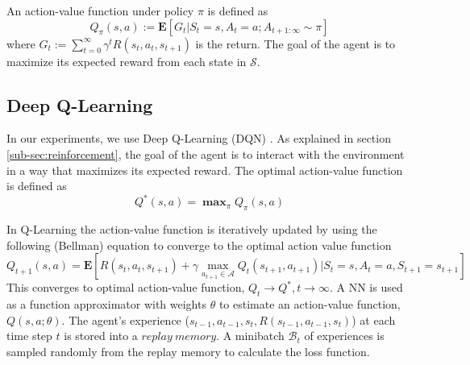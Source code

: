 \documentclass{article}
\newcommand{\cS}{\mathcal{S}}
\newcommand{\cA}{\mathcal{A}}
\newcommand{\cB}{\mathcal{B}}
\begin{document}
An action-value function under policy $\pi$ is defined as
$$Q_\pi(s, a) := \mathbf{E}[G_t|S_t =s, A_t=a; A_{t+1: \infty} \sim \pi]$$
where $G_t := \sum_{t=0}^\infty \gamma^t R(s_t, a_t, s_{t+1})$ is the return.
The goal of the agent is to maximize its expected reward from each state in $\cS$.

\subsection{Deep Q-Learning} \label{sub-sec:dqn}
In our experiments, we use Deep Q-Learning (DQN) \cite[]{mnih2013playing}.
As explained in section \ref{sub-sec:reinforcement}, the goal of the agent is to interact with the environment in a way that maximizes its expected reward.
The optimal action-value function is defined as
$$Q^*(s, a) = \mathbf \max_{\pi} Q_\pi(s, a)$$

In Q-Learning the action-value function is iteratively updated by using the following (Bellman) equation to converge to the optimal action value function
$$Q_{t+1}(s, a) = \mathbf{E}[R(s_t, a_t, s_{t+1}) + \gamma \max_{a_{t+1} \in \cA} Q_t(s_{t+1}, a_{t+1})|S_t =s, A_t=a, S_{t+1}=s_{t+1}]$$
This converges to optimal action-value function, $Q_t \rightarrow Q^*, t \rightarrow \infty$.
A NN is used as a function approximator with weights $\theta$ to estimate an action-value function, $Q(s, a; \theta)$.
The agent's experience ($s_{t-1}, a_{t-1}, s_t, R(s_{t-1}, a_{t-1}, s_t)$) at each time step $t$ is stored into a $replay\ memory$.
A minibatch $\cB_t$ of experiences is sampled randomly from the replay memory to calculate the loss function.
\end{document}
